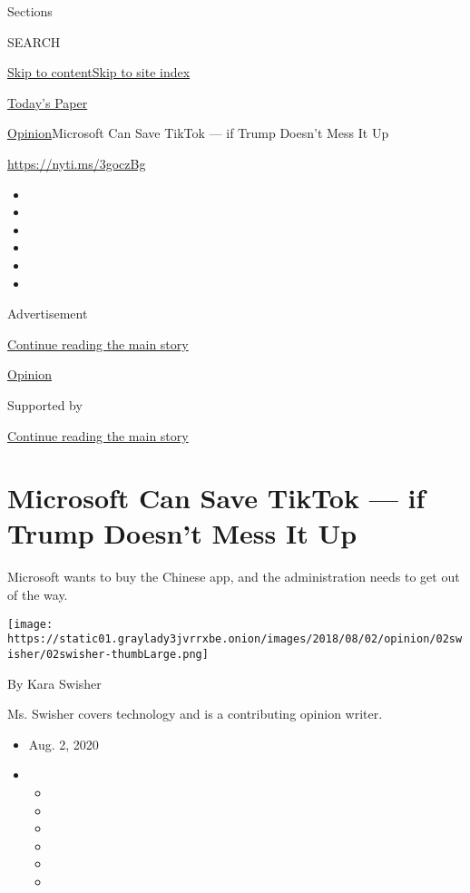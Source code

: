 Sections

SEARCH

\protect\hyperlink{site-content}{Skip to
content}\protect\hyperlink{site-index}{Skip to site index}

\href{https://myaccount.nytimes3xbfgragh.onion/auth/login?response_type=cookie\&client_id=vi}{}

\href{https://www.nytimes3xbfgragh.onion/section/todayspaper}{Today's
Paper}

\href{/section/opinion}{Opinion}\textbar{}Microsoft Can Save TikTok ---
if Trump Doesn't Mess It Up

\url{https://nyti.ms/3goczBg}

\begin{itemize}
\item
\item
\item
\item
\item
\item
\end{itemize}

Advertisement

\protect\hyperlink{after-top}{Continue reading the main story}

\href{/section/opinion}{Opinion}

Supported by

\protect\hyperlink{after-sponsor}{Continue reading the main story}

\hypertarget{microsoft-can-save-tiktok--if-trump-doesnt-mess-it-up}{%
\section{Microsoft Can Save TikTok --- if Trump Doesn't Mess It
Up}\label{microsoft-can-save-tiktok--if-trump-doesnt-mess-it-up}}

Microsoft wants to buy the Chinese app, and the administration needs to
get out of the way.

\texttt{[image: https://static01.graylady3jvrrxbe.onion/images/2018/08/02/opinion/02swisher/02swisher-thumbLarge.png]}

By Kara Swisher

Ms. Swisher covers technology and is a contributing opinion writer.

\begin{itemize}
\item
  Aug. 2, 2020
\item
  \begin{itemize}
  \item
  \item
  \item
  \item
  \item
  \item
  \end{itemize}
\end{itemize}

